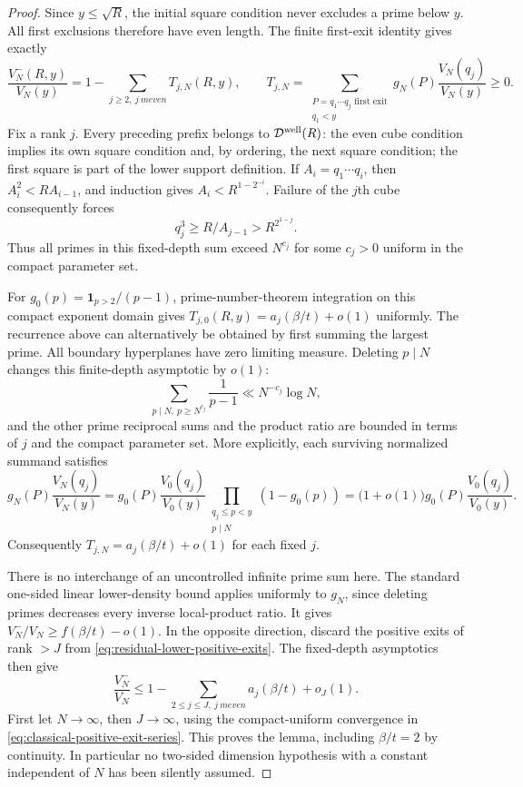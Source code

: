 \begin{proof}
Since $y\le\sqrt R$, the initial square condition never excludes
a prime below $y$. All first exclusions therefore have even length.
The finite first-exit identity gives exactly
\begin{equation}\label{eq:residual-lower-positive-exits}
 \frac{V_N^-(R,y)}{V_N(y)}
 =1-\sum_{j\ge2,\ j\ {
m even}} T_{j,N}(R,y),\qquad
 T_{j,N}=\sum_{\substack{P=q_1\cdots q_j\text{ first exit}\\q_1<y}}
 g_N(P)\frac{V_N(q_j)}{V_N(y)}\ge0.
\end{equation}
Fix a rank $j$. Every preceding prefix belongs to
$\mathcal D^{\rm well}(R)$: the even cube condition implies its
own square condition and, by ordering, the next square condition;
the first square is part of the lower support definition.
If $A_i=q_1\cdots q_i$, then $A_i^2<R A_{i-1}$, and induction gives
$A_i<R^{1-2^{-i}}$. Failure of the $j$th cube consequently forces
\[
 q_j^3\ge R/A_{j-1}>R^{2^{1-j}}.
\]
Thus all primes in this fixed-depth sum exceed $N^{c_j}$ for some
$c_j>0$ uniform in the compact parameter set.

For $g_0(p)=\mathbf1_{p>2}/(p-1)$, prime-number-theorem integration
on this compact exponent domain gives
$T_{j,0}(R,y)=a_j(\beta/t)+o(1)$ uniformly. The recurrence above
can alternatively be obtained by first summing the largest prime.
All boundary hyperplanes have zero limiting measure.
Deleting $p\mid N$ changes this finite-depth asymptotic by $o(1)$:
\[
 \sum_{p\mid N,\ p\ge N^{c_j}}\frac1{p-1}
 \ll N^{-c_j}\log N,
\]
and the other prime reciprocal sums and the product ratio are bounded
in terms of $j$ and the compact parameter set. More explicitly, each
surviving normalized summand satisfies
\[
 g_N(P)\frac{V_N(q_j)}{V_N(y)}
 =g_0(P)\frac{V_0(q_j)}{V_0(y)}
   \prod_{\substack{q_j\le p<y\\p\mid N}}(1-g_0(p))
 =\bigl(1+o(1)\bigr)
   g_0(P)\frac{V_0(q_j)}{V_0(y)}.
\]
Consequently $T_{j,N}=a_j(\beta/t)+o(1)$ for each fixed $j$.

There is no interchange of an uncontrolled infinite prime sum here.
The standard one-sided linear lower-density bound applies uniformly
to $g_N$, since deleting primes decreases every inverse local-product
ratio. It gives $V_N^-/V_N\ge f(\beta/t)-o(1)$.
In the opposite direction, discard the positive exits of rank $>J$
from \eqref{eq:residual-lower-positive-exits}. The fixed-depth
asymptotics then give
\[
 \frac{V_N^-}{V_N}\le
 1-\sum_{2\le j\le J,\ j\ {
m even}}a_j(\beta/t)+o_J(1).
\]
First let $N\to\infty$, then $J\to\infty$, using the compact-uniform
convergence in \eqref{eq:classical-positive-exit-series}. This proves
the lemma, including $\beta/t=2$ by continuity. In particular no
two-sided dimension hypothesis with a constant independent of $N$
has been silently assumed.
\end{proof}

